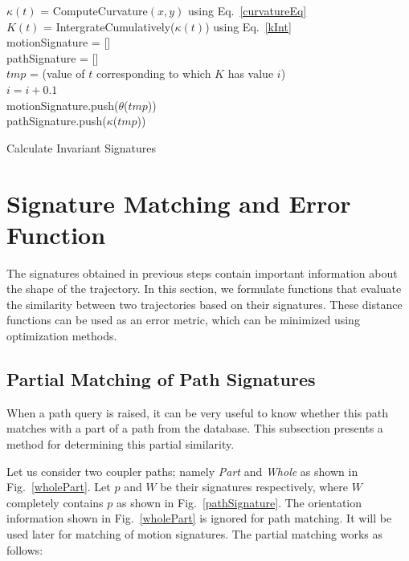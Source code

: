 \begin{algorithm}
    $\kappa(t)$ = ComputeCurvature$(x, y)$ using Eq.~\ref{curvatureEq} \\
    $K(t)$ = IntergrateCumulatively($\kappa(t)$) using Eq.~\ref{kInt} \\
    motionSignature = [] \\
    pathSignature = [] \\
    {
      $tmp$ = (value of $t$ corresponding to which $K$ has value $i$) \\
      $i = i + 0.1$ \\
      motionSignature.push($\theta$($tmp$)) \\
      pathSignature.push($\kappa$($tmp$))
    }
    \caption{Calculate Invariant Signatures}
    \label{alg_signature}
\end{algorithm}

\section{Signature Matching and Error Function}\label{sec_distanceMetric}
The signatures obtained in previous steps contain important information about the shape of the trajectory.
In this section, we formulate functions that evaluate the similarity between two trajectories based on their signatures.
These distance functions can be used as an error metric, which can be minimized using optimization methods.

\subsection{Partial Matching of Path Signatures}\label{sec_ncc}
When a path query is raised, it can be very useful to know whether this path matches with a part of a path from the database.
This subsection presents a method for determining this partial similarity.

Let us consider two coupler paths; namely \emph{Part} and \emph{Whole} as shown in Fig.~\ref{wholePart}.
Let $p$ and $W$ be their signatures respectively, where $W$ completely contains $p$ as shown in Fig.~\ref{pathSignature}.
The orientation information shown in Fig.~\ref{wholePart} is ignored for path matching. It will be used later for matching of motion signatures.
The partial matching works as follows:

